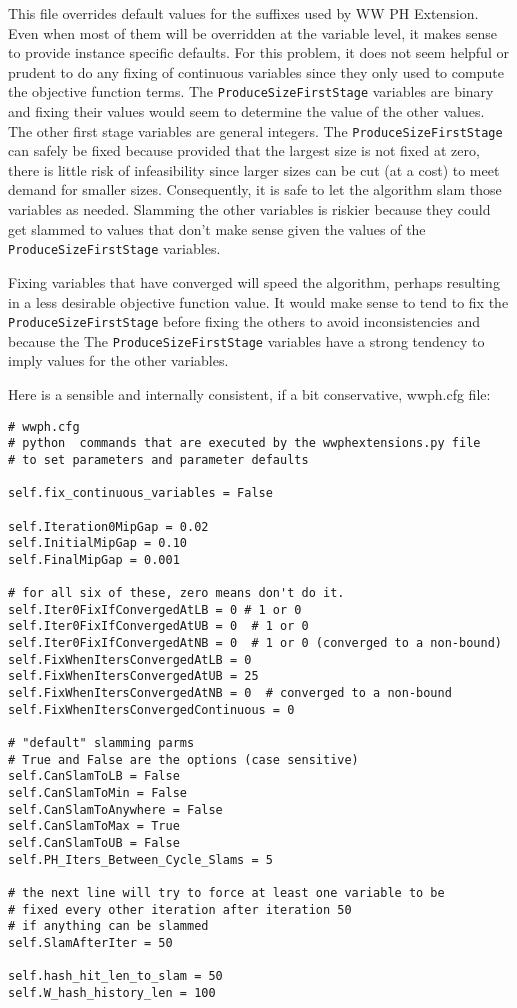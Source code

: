 This file overrides default values for the suffixes used by WW PH Extension. Even when most of them will be overridden
at the variable level, it makes sense to provide instance specific defaults. For
this problem, it does not seem helpful or prudent to do any fixing of continuous
variables since they only used to compute the objective function terms. The
\verb|ProduceSizeFirstStage| variables are binary and fixing their values would
seem to determine the value of the other values. The other first stage variables
are general integers. The \verb|ProduceSizeFirstStage| can safely be fixed
because provided that the largest size is not fixed at zero, there is little
risk of infeasibility since larger sizes can be cut (at a cost) to meet demand
for smaller sizes. Consequently, it is safe to let the algorithm slam those
variables as needed. Slamming the other variables is riskier because they could
get slammed to values that don't make sense given the values of the
\verb|ProduceSizeFirstStage| variables.

Fixing variables that have converged will speed the algorithm, perhaps resulting
in a less desirable objective function value. It would make sense to tend to fix
the \verb|ProduceSizeFirstStage| before fixing the others to avoid
inconsistencies and because the The \verb|ProduceSizeFirstStage| variables have
a strong tendency to imply values for the other variables.

Here is a sensible and internally consistent, if a bit conservative, wwph.cfg
file:

{\small
\begin{verbatim}
# wwph.cfg
# python  commands that are executed by the wwphextensions.py file
# to set parameters and parameter defaults

self.fix_continuous_variables = False

self.Iteration0MipGap = 0.02
self.InitialMipGap = 0.10
self.FinalMipGap = 0.001

# for all six of these, zero means don't do it.
self.Iter0FixIfConvergedAtLB = 0 # 1 or 0
self.Iter0FixIfConvergedAtUB = 0  # 1 or 0
self.Iter0FixIfConvergedAtNB = 0  # 1 or 0 (converged to a non-bound)
self.FixWhenItersConvergedAtLB = 0
self.FixWhenItersConvergedAtUB = 25
self.FixWhenItersConvergedAtNB = 0  # converged to a non-bound
self.FixWhenItersConvergedContinuous = 0

# "default" slamming parms
# True and False are the options (case sensitive)
self.CanSlamToLB = False
self.CanSlamToMin = False
self.CanSlamToAnywhere = False
self.CanSlamToMax = True
self.CanSlamToUB = False
self.PH_Iters_Between_Cycle_Slams = 5

# the next line will try to force at least one variable to be
# fixed every other iteration after iteration 50
# if anything can be slammed
self.SlamAfterIter = 50

self.hash_hit_len_to_slam = 50
self.W_hash_history_len = 100
\end{verbatim}
}

